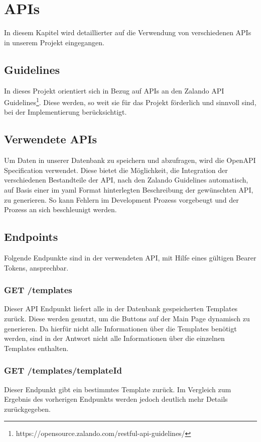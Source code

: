 \chapter{\ac{API}s}\label{ch:apis}
In diesem Kapitel wird detaillierter auf die Verwendung von verschiedenen \ac{API}s in unserem 
Projekt eingegangen.

\section{Guidelines}
In dieses Projekt orientiert sich in Bezug auf \ac{API}s an den Zalando API 
Guidelines\footnote{https://opensource.zalando.com/restful-api-guidelines/}.
Diese werden, so weit sie für das Projekt förderlich und sinnvoll sind, bei der Implementierung
berücksichtigt.

\section{Verwendete \ac{API}s}
Um Daten in unserer Datenbank zu speichern und abzufragen, wird die OpenAPI Specification
verwendet. Diese bietet die Möglichkeit, die Integration der verschiedenen Bestandteile der
\ac{API}, nach den Zalando Guidelines automatisch, auf Basis einer im \Gls{yaml} Format hinterlegten
Beschreibung der gewünschten \ac{API}, zu generieren. So kann Fehlern im Development
Prozess vorgebeugt und der Prozess an sich beschleunigt werden.

\section{Endpoints}
Folgende Endpunkte sind in der verwendeten \ac{API}, mit Hilfe eines gültigen Bearer Tokens, ansprechbar. 

\subsection{GET /templates}

Dieser \ac{API} Endpunkt liefert alle in der Datenbank gespeicherten Templates zurück. Diese
werden genutzt, um die Buttons auf der Main Page dynamisch zu generieren. Da hierfür nicht
alle Informationen über die Templates benötigt werden, sind in der Antwort nicht alle
Informationen über die einzelnen Templates enthalten.

\subsection{GET /templates/{templateId}}
Dieser Endpunkt gibt ein bestimmtes Template zurück. Im Vergleich zum Ergebnis des vorherigen
Endpunkts werden jedoch deutlich mehr Details zurückgegeben.


